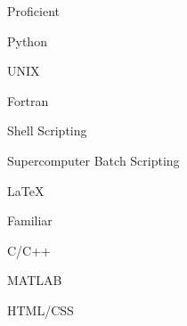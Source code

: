 \begin{cventries}

	\cventry
    {Proficient}
    {}
    {}
    {}
    {
      \begin{multicolcvitems}
        \item Python
        \item UNIX
        \item Fortran
        \item Shell Scripting        
        \item Supercomputer Batch Scripting
        \item LaTeX
      \end{multicolcvitems}
    }
    
    \vspace{-0.25cm}
    
	\cventry
	{Familiar}
	{}
	{}
	{}
	{
	\begin{multicolcvitems}
		\item C/C++
		\item MATLAB
		\item HTML/CSS
	\end{multicolcvitems}
    }

\end{cventries}

